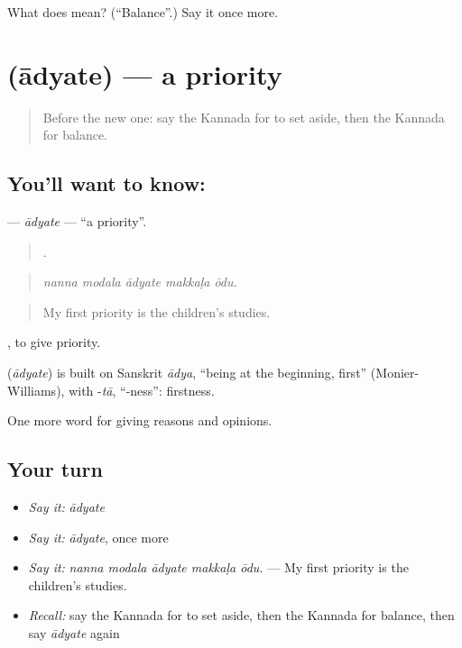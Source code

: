 \begin{tcolorbox}[breakable,colback=teal!4,colframe=teal!35!black,title={Before you move on}]
What does  mean? (\textquotedblleft{}Balance\textquotedblright{}.) Say it once more.
\end{tcolorbox}
\section[\texorpdfstring{\kn{ಆದ್ಯತೆ} (ādyate)}{ಆದ್ಯತೆ (ādyate)}]{ (ādyate) — a priority}

\label{lesson:KA-C387-adyate}



\begin{quote}
Before the new one: say the Kannada for to set aside, then the Kannada for balance.
\end{quote}

\subsection*{You'll want to know: }
\textbf{} — \emph{ādyate} — \textquotedblleft{}a priority\textquotedblright{}.

\begin{quote}
    .
\end{quote}

\begin{quote}
\emph{nanna modala ādyate makkaḷa ōdu.}
\end{quote}

\begin{quote}
My first priority is the children's studies.
\end{quote}

 , to give priority.

\begin{cousinweb}
\textbf{} (\emph{ādyate}) is built on Sanskrit \emph{ādya}, \textquotedblleft{}being at the beginning, first\textquotedblright{} (Monier-Williams), with -\emph{tā}, \textquotedblleft{}-ness\textquotedblright{}: firstness.
\end{cousinweb}

\begin{grammarlens}[title={What you've built}]
One more word for giving reasons and opinions.
\end{grammarlens}

\subsection*{Your turn}
\begin{itemize}
\raggedright
  \item \emph{Say it:} \emph{ādyate}
  \item \emph{Say it:} \emph{ādyate}, once more
  \item \emph{Say it:} \emph{nanna modala ādyate makkaḷa ōdu.} — My first priority is the children's studies.
  \item \emph{Recall:} say the Kannada for to set aside, then the Kannada for balance, then say \emph{ādyate} again
\end{itemize}

